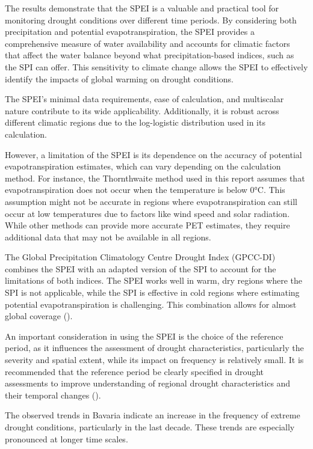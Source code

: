 \documentclass[
]{krantz}
\begin{document}
The results demonstrate that the SPEI is a valuable and practical tool for monitoring drought conditions over different time periods. By considering both precipitation and potential evapotranspiration, the SPEI provides a comprehensive measure of water availability and accounts for climatic factors that affect the water balance beyond what precipitation-based indices, such as the SPI can offer. This sensitivity to climate change allows the SPEI to effectively identify the impacts of global warming on drought conditions.

The SPEI's minimal data requirements, ease of calculation, and multiscalar nature contribute to its wide applicability. Additionally, it is robust across different climatic regions due to the log-logistic distribution used in its calculation.

However, a limitation of the SPEI is its dependence on the accuracy of potential evapotranspiration estimates, which can vary depending on the calculation method. For instance, the Thornthwaite method used in this report assumes that evapotranspiration does not occur when the temperature is below 0°C. This assumption might not be accurate in regions where evapotranspiration can still occur at low temperatures due to factors like wind speed and solar radiation. While other methods can provide more accurate PET estimates, they require additional data that may not be available in all regions.

The Global Precipitation Climatology Centre Drought Index (GPCC-DI) combines the SPEI with an adapted version of the SPI to account for the limitations of both indices. The SPEI works well in warm, dry regions where the SPI is not applicable, while the SPI is effective in cold regions where estimating potential evapotranspiration is challenging. This combination allows for almost global coverage (\citet{ziese2014}).

An important consideration in using the SPEI is the choice of the reference period, as it influences the assessment of drought characteristics, particularly the severity and spatial extent, while its impact on frequency is relatively small. It is recommended that the reference period be clearly specified in drought assessments to improve understanding of regional drought characteristics and their temporal changes (\citet{um2017}).

The observed trends in Bavaria indicate an increase in the frequency of extreme drought conditions, particularly in the last decade. These trends are especially pronounced at longer time scales.
\end{document}
